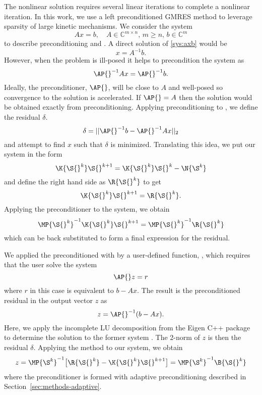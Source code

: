 The nonlinear solution requires several linear iterations to complete a nonlinear iteration.
In this work, we use a left preconditioned GMRES method to leverage sparsity of large kinetic mechanisms.
We consider the system
\begin{equation}
    \label{sys:axb}
    A x = b,\quad A\in \mathbb{C}^{m\times n},\, m\geq n ,\,b\in \mathbb{C}^{m}
\end{equation}
to describe preconditioning and \gmres{}.
A direct solution of
\eqref{sys:axb} would be
\begin{equation}
    x = A^{-1}b.
\end{equation}
However, when the problem is ill-posed it helps to precondition the
system as
\begin{equation}
    \AP{}^{-1}Ax = \AP{}^{-1}b.
\end{equation}
Ideally, the preconditioner, $\AP{}$, will be close to $A$ and
well-posed so convergence to the solution is accelerated. If $\AP{}=A$
then the solution would be obtained exactly from preconditioning.
Applying preconditioning to \gmres{}, we define the residual $\delta$.
\begin{equation}
    \delta = ||\AP{}^{-1}b-\AP{}^{-1}Ax||_2
\end{equation}
and attempt to find $x$ such that $\delta$ is minimized.
Translating this idea, we put our system in the form
\begin{equation}
    \K{\S{}^{k}}\S{}^{k+1} =  \K{\S{}^{k}}\S{}^{k}-\N{\S^{k}}
\end{equation}
and define the right hand side as $\R{\S{}^{k}}$ to get
\begin{equation}
    \label{eq:mf-system}
    \K{\S{}^{k}}\S{}^{k+1} = \R{\S{}^{k}}.
\end{equation}
Applying the preconditioner to the system, we obtain
\begin{equation}
    \MP{\S{}^{k}}^{-1}\K{\S{}^{k}}\S{}^{k+1} = \MP{\S{}^{k}}^{-1}\R{\S{}^{k}}
\end{equation}
which can be back substituted to form a final expression for the residual.


We applied the preconditioned \gmres{} with \sundials{} by a user-defined function, \psolve{}, which requires that the user solve the system
\begin{equation}
    \AP{}z = r
\end{equation}
where $r$ in this case is equivalent to $b-Ax$.
The result is the preconditioned residual in the output vector $z$ as
\begin{equation}
    z =\AP{}^{-1}(b-Ax).
\end{equation}
Here, we apply the incomplete LU decomposition from the Eigen C++ package to determine the solution to the former system \cite{guennebaud_eigen_2010}.
The 2-norm of $z$ is then the residual $\delta$.
Applying the \sundials{} method to our system, we obtain
\begin{equation}
    z = \MP{\S^{k}}^{-1}\big[\R{\S{}^{k}}-\K{\S{}^{k}}\S{}^{k+1}\big] = \MP{\S^{k}}^{-1}\B{\S{}^{k}}
\end{equation}
where the preconditioner is formed with adaptive preconditioning described in Section~\ref{sec:methods-adaptive}.

